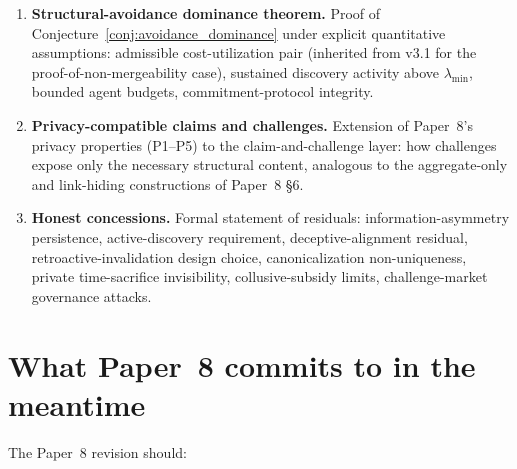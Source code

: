 \documentclass{article}
\begin{document}
\begin{enumerate}
\item \textbf{Structural-avoidance dominance theorem.}
  Proof of Conjecture~\ref{conj:avoidance_dominance} under
  explicit quantitative assumptions: admissible cost-utilization
  pair (inherited from v3.1 for the proof-of-non-mergeability
  case), sustained discovery activity above
  $\lambda_{\min}$, bounded agent budgets,
  commitment-protocol integrity.

\item \textbf{Privacy-compatible claims and challenges.}
  Extension of Paper~8's privacy properties (P1--P5) to the
  claim-and-challenge layer: how challenges expose only the
  necessary structural content, analogous to the aggregate-only
  and link-hiding constructions of Paper~8 \S6.

\item \textbf{Honest concessions.}
  Formal statement of residuals: information-asymmetry
  persistence, active-discovery requirement, deceptive-alignment
  residual, retroactive-invalidation design choice,
  canonicalization non-uniqueness, private time-sacrifice
  invisibility, collusive-subsidy limits, challenge-market
  governance attacks.
\end{enumerate}

\section{What Paper~8 commits to in the meantime}

The Paper~8 revision should:
\end{document}
